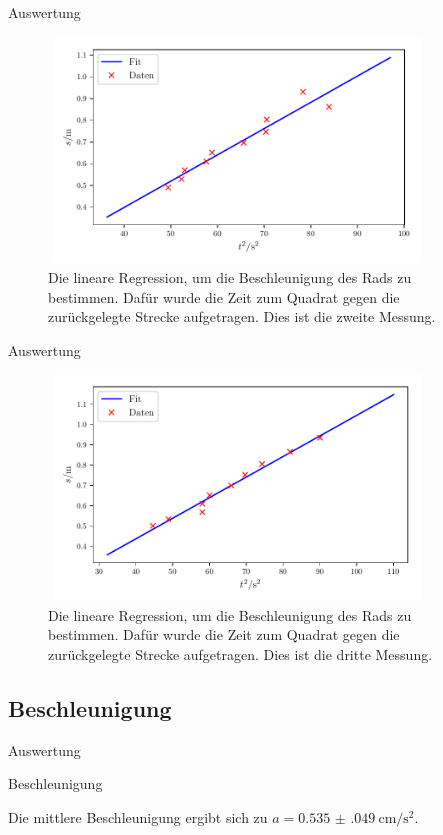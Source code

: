 \begin{frame}{Auswertung}
    \begin{figure}   
    
    \centering
    \includegraphics[width=10cm, height=6cm]{build/plot2b.pdf}
    \caption{Die lineare Regression, um die Beschleunigung des Rads zu bestimmen. Dafür wurde die Zeit zum Quadrat gegen die zurückgelegte Strecke aufgetragen. Dies ist die zweite Messung.} 

    \label{fig:plot2b}
\end{figure}
\end{frame}

\begin{frame}{Auswertung}
    \begin{figure}   
    
    \centering
    \includegraphics[width=10cm, height=6cm]{build/plot3b.pdf}
    \caption{Die lineare Regression, um die Beschleunigung des Rads zu bestimmen. Dafür wurde die Zeit zum Quadrat gegen die zurückgelegte Strecke aufgetragen. Dies ist die dritte Messung.} 

    \label{fig:plot3b}
\end{figure}
\end{frame}

\subsection{Beschleunigung}
\begin{frame}{Auswertung}
    \begin{block}{Beschleunigung}
        
        Die mittlere Beschleunigung ergibt sich zu $a = \SI{0.535(049)}{\centi\meter\per\second\squared}$.
    \end{block}
\end{frame}
    
